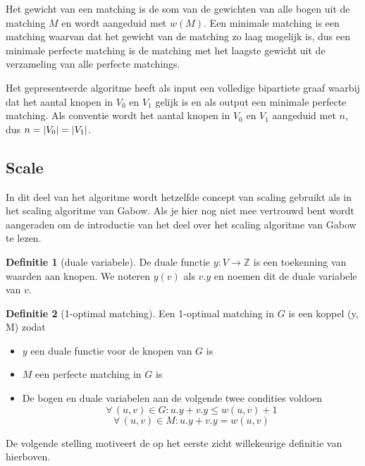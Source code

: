 \documentclass[conference]{IEEEtran}
\theoremstyle{definition}
\newtheorem{definition}{Definitie}[section]
\theoremstyle{remark}
\DeclarePairedDelimiter{\card}{\vert}{\vert}  %
\let \oldforall \forall
\renewcommand{\forall}{\oldforall\,}
\begin{document}
Het gewicht van een matching is de som van de gewichten van alle bogen uit de matching $M$ en wordt aangeduid met $w(M)$. Een minimale matching is een matching waarvan dat het gewicht van de matching zo laag mogelijk is, dus een minimale perfecte matching is de matching met het laagste gewicht uit de verzameling van alle perfecte matchings.

Het gepresenteerde algoritme heeft als input een volledige bipartiete graaf waarbij dat het aantal knopen in $V_0$ en $V_1$ gelijk is en als output een minimale perfecte matching. Als conventie wordt het aantal knopen in $V_0$ en $V_1$ aangeduid met $n$, dus $n = \card{V_0} = \card{V_1}$.

\subsection{Scale}
In dit deel van het algoritme wordt hetzelfde concept van scaling gebruikt als in het scaling algoritme van Gabow. Als je hier nog niet mee vertrouwd bent wordt aangeraden om de introductie van het deel over het scaling algoritme van Gabow te lezen.
\begin{definition}[duale variabele]
    De duale functie $y: V \longrightarrow \mathbb{Z}$ is een toekenning van waarden aan knopen. We noteren $y(v)$ als $v.y$ en noemen dit de duale variabele van $v$.
\end{definition}
\begin{definition}[1-optimal matching]
    Een 1-optimal matching in $G$ is een koppel (y, M) zodat
    \begin{itemize}
        \item $y$ een duale functie voor de knopen van $G$ is
        \item $M$ een perfecte matching in $G$ is
        \item De bogen en duale variabelen aan de volgende twee condities voldoen
            \begin{equation}
                \forall (u, v) \in G: u.y + v.y \leq w(u, v) + 1 \label{eq:def:oneOpt1}
            \end{equation}
            \begin{equation}
                \forall (u, v) \in M: u.y + v.y = w(u, v) \label{eq:def:oneOpt2}
            \end{equation}
    \end{itemize}
\end{definition}

De volgende stelling motiveert de op het eerste zicht willekeurige definitie van hierboven.
\end{document}
